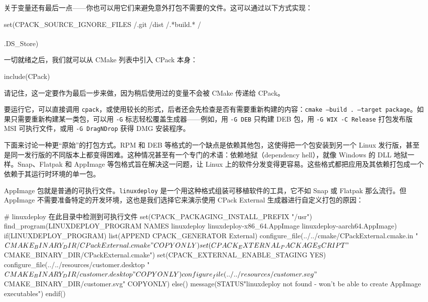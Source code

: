 关于变量还有最后一点——你也可以用它们来避免意外打包不需要的文件。这可以通过以下方式实现：

\begin{codebox}[cmake]
set(CPACK_SOURCE_IGNORE_FILES /.git /dist /.*build.* /\\\\.DS_Store)
\end{codebox}

一切就绪之后，我们就可以从 CMake 列表中引入 CPack 本身：

\begin{codebox}[cmake]
include(CPack)
\end{codebox}

请记住，这一定要作为最后一步来做，因为稍后使用过的变量不会被 CMake 传递给 CPack。

要运行它，可以直接调用 \texttt{cpack}，或使用较长的形式，后者还会先检查是否有需要重新构建的内容：\texttt{cmake --build .\allowbreak{} --target package}。如果只需要重新构建某一类包，可以用 \texttt{-G} 标志轻松覆盖生成器——例如，用 \texttt{-G DEB} 只构建 DEB 包，用 \texttt{-G WIX -C Release} 打包发布版 MSI 可执行文件，或用 \texttt{-G Drag\allowbreak{}NDrop} 获得 DMG 安装程序。

下面来讨论一种更“原始”的打包方式。RPM 和 DEB 等格式的一个缺点是依赖其他包，这使得把一个包安装到另一个 Linux 发行版，甚至是同一发行版的不同版本上都变得困难。这种情况甚至有一个专门的术语：依赖地狱（dependency hell），就像 Windows 的 DLL 地狱一样。Snap、Flatpak 和 AppImage 等包格式旨在解决这一问题，让 Linux 上的软件分发变得更容易。这些格式都把应用及其依赖打包成一个依赖于其运行时环境的单一包。

\label{idx:713}
\label{idx:714}
AppImage 包就是普通的可执行文件。\texttt{linuxdeploy} 是一个用这种格式组装可移植软件的工具，它不如 Snap 或 Flatpak 那么流行。但 AppImage 不需要准备特定的开发环境，这也是我们选择它来演示使用 CPack External 生成器进行自定义打包的原因：

\begin{codebox}[cmake]
# linuxdeploy 在此目录中检测到可执行文件 set(CPACK_PACKAGING_INSTALL_PREFIX "/usr")
find_program(LINUXDEPLOY_PROGRAM NAMES linuxdeploy linuxdeploy-x86_64.AppImage
                                       linuxdeploy-aarch64.AppImage)
if(LINUXDEPLOY_PROGRAM)
  list(APPEND CPACK_GENERATOR External)
  configure_file(../../cmake/CPackExternal.cmake.in
                 "${CMAKE_BINARY_DIR}/CPackExternal.cmake" COPYONLY)
  set(CPACK_EXTERNAL_PACKAGE_SCRIPT
      "${CMAKE_BINARY_DIR}/CPackExternal.cmake")
  set(CPACK_EXTERNAL_ENABLE_STAGING YES)
  configure_file(../../resources/customer.desktop
                 "${CMAKE_BINARY_DIR}/customer.desktop" COPYONLY)
  configure_file(../../resources/customer.svg
                 "${CMAKE_BINARY_DIR}/customer.svg" COPYONLY)
else()
  message(STATUS"linuxdeploy not found - won't be able to create AppImage executables")
endif()
\end{codebox}

